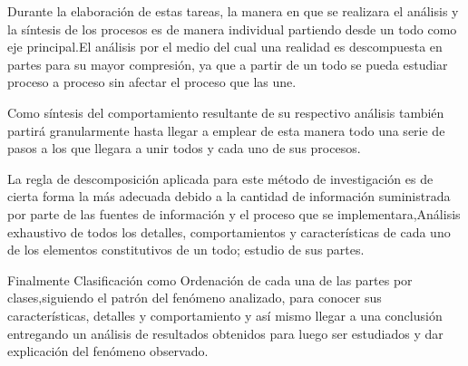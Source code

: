 \documentclass[a4paper, 11pt, oneside]{article}
\theoremstyle{definition}
\theoremstyle{remark}
\begin{document}
Durante la elaboración de estas tareas, la manera en que se realizara el análisis y la síntesis de los procesos es de manera individual partiendo desde un todo  como eje principal.El análisis por el medio del cual una realidad es descompuesta en partes para su mayor compresión, ya que a partir de un todo se pueda estudiar proceso a proceso sin afectar el proceso que las une. 

Como síntesis del comportamiento resultante de su respectivo análisis  también partirá granularmente hasta llegar a emplear de esta manera todo una serie de pasos a los que llegara a unir todos y cada uno de sus procesos.

La regla de descomposición aplicada para este método de investigación es de cierta forma la más adecuada debido a la cantidad de información suministrada por parte de las fuentes de información y el proceso que se implementara,Análisis exhaustivo de todos los detalles,
comportamientos y características de cada uno de los elementos constitutivos de un todo; estudio de sus partes.

Finalmente Clasificación como Ordenación de cada una de las partes por clases,siguiendo el patrón del fenómeno analizado, para conocer sus características, detalles y comportamiento y así mismo llegar a una conclusión entregando un análisis de resultados obtenidos para luego ser estudiados y dar explicación del fenómeno observado.
\end{document}
